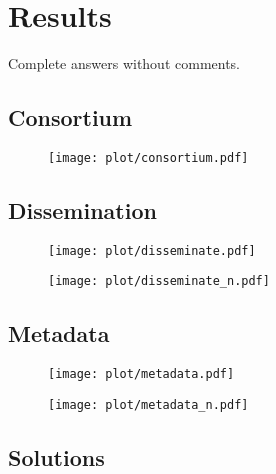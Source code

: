 \documentclass[headsepline,titlepage,twoside,12pt,toc=flat,headings=normal]{scrreprt}
\begin{document}
\chapter{Results}\label{ch:results}

\clearpage
\begin{sidewaystable}
\caption{Complete answers without comments.}
\label{tab:results}
\tiny
\setlength{\tabcolsep}{2pt}

\end{sidewaystable}
\restoregeometry

\section{Consortium}

\begin{figure}[h!]
\texttt{[image: plot/consortium.pdf]}
\caption{}
\label{fig:consortium}
\end{figure}

\section{Dissemination}

\begin{figure}[h!]
\texttt{[image: plot/disseminate.pdf]}
\caption{}
\label{fig:disseminate}
\end{figure}

\begin{figure}[h!]
\texttt{[image: plot/disseminate\_n.pdf]}
\caption{}
\label{fig:disseminate_n}
\end{figure}

\section{Metadata}

\begin{figure}[h!]
\texttt{[image: plot/metadata.pdf]}
\caption{}
\label{fig:metadata}
\end{figure}

\begin{figure}[h!]
\texttt{[image: plot/metadata\_n.pdf]}
\caption{}
\label{fig:metadata_n}
\end{figure}

\section{Solutions}
\end{document}
